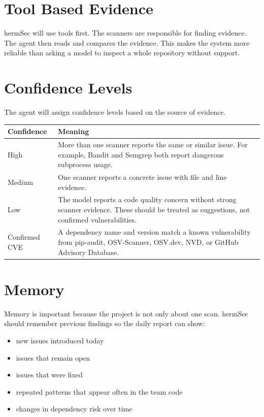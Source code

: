 \documentclass[
    numbers=noenddot,
    parskip=half-,
    fontsize=11pt,
    paper=a4,
    oneside,
    titlepage,
    bibliography=totoc,
    chapterprefix=false
]{scrbook}
\begin{document}
\section{Tool Based Evidence}

hermSec will use tools first. The scanners are responsible for finding evidence. The agent then reads and compares the evidence. This makes the system more reliable than asking a model to inspect a whole repository without support.

\section{Confidence Levels}

The agent will assign confidence levels based on the source of evidence.

\begin{longtable}{p{4cm}p{10cm}}
\toprule
\textbf{Confidence} & \textbf{Meaning} \\
\midrule
\endhead
High & More than one scanner reports the same or similar issue. For example, Bandit and Semgrep both report dangerous subprocess usage. \\
\addlinespace
Medium & One scanner reports a concrete issue with file and line evidence. \\
\addlinespace
Low & The model reports a code quality concern without strong scanner evidence. These should be treated as suggestions, not confirmed vulnerabilities. \\
\addlinespace
Confirmed CVE & A dependency name and version match a known vulnerability from pip-audit, OSV-Scanner, OSV.dev, NVD, or GitHub Advisory Database. \\
\bottomrule
\end{longtable}

\section{Memory}

Memory is important because the project is not only about one scan. hermSec should remember previous findings so the daily report can show:

\begin{itemize}
    \item new issues introduced today
    \item issues that remain open
    \item issues that were fixed
    \item repeated patterns that appear often in the team code
    \item changes in dependency risk over time
\end{itemize}
\end{document}

